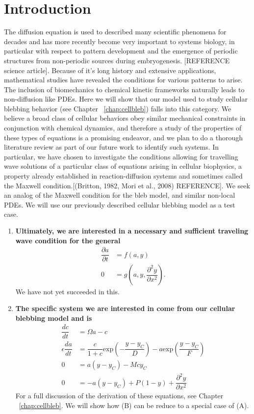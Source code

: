 \section{Introduction}

The diffusion equation is used to described many scientific phenomena for decades and has more recently become very important to systems biology, in particular with respect to pattern development and the emergence of periodic structures from non-periodic sources during embryogenesis. [REFERENCE science article]. Because of it's long history and extensive applications, mathematical studies have revealed the conditions for various patterns to arise. The inclusion of biomechanics to chemical kinetic frameworks naturally leads to non-diffusion like PDEs. Here we will show that our model used to study cellular blebbing behavior (see Chapter ~\ref{chap:cellbleb}) falls into this category. We believe a broad class of cellular behaviors obey similar mechanical constraints in conjunction with chemical dynamics, and therefore a study of the properties of these types of equations is a promising endeavor, and we plan to do a thorough literature review as part of our future work to identify such systems. In particular, we have chosen to investigate the conditions allowing for travelling wave solutions of a particular class of equations arising in cellular biophysics, a property already established in reaction-diffusion systems and sometimes called the Maxwell condition.[(Britton, 1982, Mori et al., 2008) REFERENCE]. We seek an analog of the Maxwell condition for the bleb model, and similar non-local PDEs. We will use our previously described cellular blebbing model as a test case.\\

\begin{enumerate}[label=(\Alph*)]
\item \textbf{Ultimately, we are interested in a necessary and sufficient traveling wave condition for the general}
\begin{align}
\dfrac{\partial a}{ \partial t}  & =  f(a,y)\\
0 & =g \left(a,y,\dfrac{\partial^2 y}{\partial x^2}\right).
\end{align}
We have not yet succeeded in this. 
\item\textbf{The specific system we are interested in come from our cellular blebbing model and is}
\begin{align}
\dfrac{dc}{dt}  & =  \Omega a - c\label{eq::nondimc}\\
\epsilon\dfrac{da}{ dt}  & =  \dfrac{c}{1+c} \mbox{exp}\left(-\dfrac{y-y_C}{D}\right) - a \mbox{exp} \left(\dfrac{y-y_C}{F} \right)\label{eq::nondima}\\
0 & = a(y-y_C) - Mcy_C\label{eq::nondimyC}\\
0 & = -a(y - y_C) + P (1-y) + \dfrac{\partial^2 y}{\partial x^2}\label{eq::nondimyM}
\end{align}
For a full discussion of the derivation of these equations, see Chapter ~\ref{chap:cellbleb}. We will show how (B) can be reduce to a special case of (A). 
\end{enumerate}






